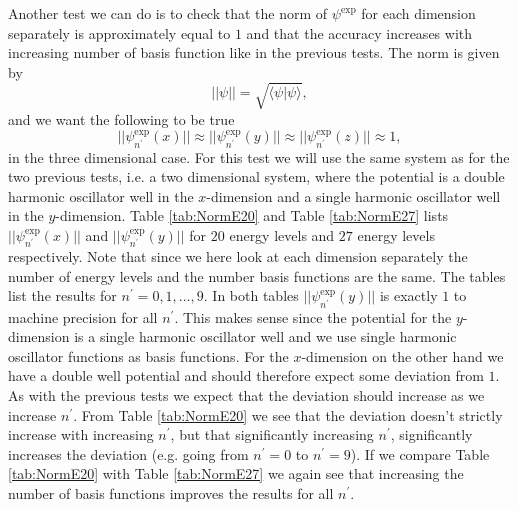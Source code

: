 \documentclass[../main.tex]{subfiles}
\begin{document}
Another test we can do is to check that the norm of $\psi^\textrm{exp}$ for each dimension separately is approximately equal to $1$ and that the accuracy increases with increasing number of basis function like in the previous tests. The norm is given by
\begin{equation}
    ||\psi|| = \sqrt{\langle \psi|\psi \rangle},
\end{equation}
and we want the following to be true
\begin{equation}
    ||\psi_{n^\prime}^\textrm{exp}(x)|| \approx ||\psi_{n^\prime}^\textrm{exp}(y)|| \approx ||\psi_{n^\prime}^\textrm{exp}(z)|| \approx 1,
\end{equation}
in the three dimensional case. For this test we will use the same system as for the two previous tests, i.e. a two dimensional system, where the potential is a double harmonic oscillator well in the $x$-dimension and a single harmonic oscillator well in the $y$-dimension. Table \ref{tab:NormE20} and Table \ref{tab:NormE27} lists $||\psi_{n^\prime}^\textrm{exp}(x)||$ and $||\psi_{n^\prime}^\textrm{exp}(y)||$ for $20$ energy levels and $27$ energy levels respectively. Note that since we here look at each dimension separately the number of energy levels and the number basis functions are the same. The tables list the results for $n^\prime = 0,1,\dots,9$. In both tables $||\psi_{n^\prime}^\textrm{exp}(y)||$ is exactly $1$ to machine precision for all $n^\prime$. This makes sense since the potential for the $y$-dimension is a single harmonic oscillator well and we use single harmonic oscillator functions as basis functions. For the $x$-dimension on the other hand we have a double well potential and should therefore expect some deviation from $1$. As with the previous tests we expect that the deviation should increase as we increase $n^\prime$. From Table \ref{tab:NormE20} we see that the deviation doesn't strictly increase with increasing $n^\prime$, but that significantly increasing $n^\prime$, significantly increases the deviation (e.g. going from $n^\prime = 0$ to $n^\prime = 9$). If we compare Table \ref{tab:NormE20} with Table \ref{tab:NormE27} we again see that increasing the number of basis functions improves the results for all $n^\prime$.
\end{document}
